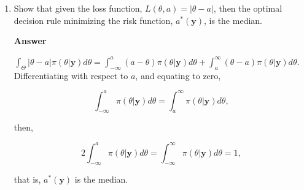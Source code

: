 \begin{enumerate}[leftmargin=*]
\item Show that given the loss function, $L({\theta},a)=|{\theta}-a|$, then the optimal decision rule minimizing the risk function, $a^*(\mathbf{y})$, is the median.

\textbf{Answer}

$\int_{{\Theta}} |{\theta}-a|\pi({\theta}|\mathbf{y})d{\theta}=\int_{-\infty}^a (a-{\theta})\pi({\theta}|\mathbf{y})d{\theta}+\int_{a}^{\infty} ({\theta}-a)\pi({\theta}|\mathbf{y})d{\theta}$. Differentiating with respect to $a$, and equating to zero,

\begin{equation}
	\int_{-\infty}^a \pi({\theta}|\mathbf{y})d{\theta}=\int_{a}^{\infty} \pi({\theta}|\mathbf{y})d{\theta},  
\end{equation}

then,

\begin{equation}
	2\int_{-\infty}^a \pi({\theta}|\mathbf{y})d{\theta}=\int_{-\infty}^{\infty} \pi({\theta}|\mathbf{y})d{\theta}=1,  
\end{equation}

that is, $a^*(\mathbf{y})$ is the median.
\end{enumerate}